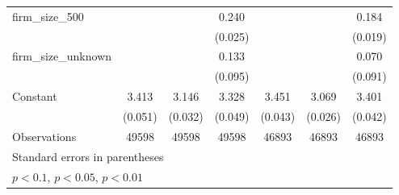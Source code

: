 {\begin{tabular}{l*{6}{c}}
firm\_size\_500       &                     &                     &       0.240\sym{***}&                     &                     &       0.184\sym{***}\\
                    &                     &                     &     (0.025)         &                     &                     &     (0.019)         \\
firm\_size\_unknown   &                     &                     &       0.133         &                     &                     &       0.070         \\
                    &                     &                     &     (0.095)         &                     &                     &     (0.091)         \\
Constant            &       3.413\sym{***}&       3.146\sym{***}&       3.328\sym{***}&       3.451\sym{***}&       3.069\sym{***}&       3.401\sym{***}\\
                    &     (0.051)         &     (0.032)         &     (0.049)         &     (0.043)         &     (0.026)         &     (0.042)         \\
\hline
Observations        &       49598         &       49598         &       49598         &       46893         &       46893         &       46893         \\
\hline\hline
\multicolumn{7}{l}{\footnotesize Standard errors in parentheses}\\
\multicolumn{7}{l}{\footnotesize \sym{*} \(p<0.1\), \sym{**} \(p<0.05\), \sym{***} \(p<0.01\)}\\
\end{tabular}
}
